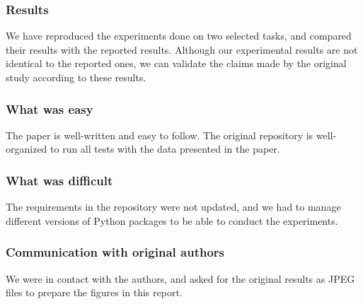 
\subsubsection*{Results}

We have reproduced the experiments done on two selected tasks, and compared their results with the reported results. Although our experimental results are not identical to the reported ones, we can validate the claims made by the original study according to these results.


\subsubsection*{What was easy}

The paper is well-written and easy to follow. The original repository is well-organized to run all tests with the data presented in the paper. 

\subsubsection*{What was difficult}

The requirements in the repository were not updated, and we had to manage different versions of Python packages to be able to conduct the experiments. 

\subsubsection*{Communication with original authors}

We were in contact with the authors, and asked for the original results as JPEG files to prepare the figures in this report.
